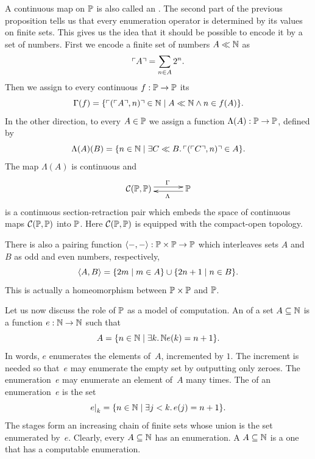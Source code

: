 A continuous map on $\mathbb{P}$ is also called an . The second part of the previous proposition tells us that
every enumeration operator is determined by its values on finite sets.
This gives us the idea that it should be possible to encode it by a
set of numbers. First we encode a finite set of numbers $A \ll \mathbb{N}$
as
%
\begin{equation*}
  \ulcorner A \urcorner = \sum_{n \in A} 2^n.
\end{equation*}
%
Then we assign to every continuous $f : \mathbb{P} \to \mathbb{P}$ its
%
\begin{equation*}
  \Gamma(f) = \{\ulcorner (\ulcorner A \urcorner, n) \urcorner \in \mathbb{N} \mid
    A \ll \mathbb{N} \land n \in f(A)
  \}.
\end{equation*}
%
In the other direction, to every $A \in \mathbb{P}$ we assign a function
$\Lambda(A) : \mathbb{P} \to \mathbb{P}$, defined by
%
\begin{equation*}
  \Lambda(A)(B) = \{n \in \mathbb{N} \mid
    \exists C \ll B .\, \ulcorner (\ulcorner C \urcorner, n) \urcorner \in A
  \}.
\end{equation*}
%
The map $\Lambda(A)$ is continuous and
%
\begin{equation*}
  \xymatrix{
    **[l]{\mathcal{C}(\Scott, \Scott)}
    \ar@<+0.25em>[r]^{\Gamma}
    &
    {\Scott}
    \ar@<+0.25em>[l]^{\Lambda}
  }
\end{equation*}
%
is a continuous section-retraction pair which embeds the space of
continuous maps $\mathcal{C}(\mathbb{P}, \mathbb{P})$ into $\mathbb{P}$. Here
$\mathcal{C}(\mathbb{P}, \mathbb{P})$ is equipped with the compact-open
topology.

There is also a pairing function $\langle {-}, {-} \rangle : \mathbb{P} \times
\mathbb{P} \to \mathbb{P}$ which interleaves sets $A$ and $B$ as odd and even
numbers, respectively,
%
\begin{equation*}
  \langle A, B \rangle = \{2 m \mid m \in A\} \cup \{2 n + 1 \mid n \in B\}.
\end{equation*}
%
This is actually a homeomorphism between $\mathbb{P} \times \mathbb{P}$ and
$\mathbb{P}$.

Let us now discuss the role of $\mathbb{P}$ as a model of computation. An
 of a set $A \subseteq \mathbb{N}$ is a function $e : \mathbb{N}
\to \mathbb{N}$ such that
%
\begin{equation*}
  A = \{n \in \mathbb{N} \mid \exists k .\,{\mathbb{N}}{e(k) = n + 1}\}.
\end{equation*}
%
In words, $e$ enumerates the elements of~$A$, incremented by $1$. The
increment is needed so that~$e$ may enumerate the empty set by
outputting only zeroes. The enumeration~$e$ may enumerate an element
of~$A$ many times. The  of an enumeration~$e$ is
the set
%
\begin{equation*}
  e{\mid}_{k} = \{n \in \mathbb{N} \mid \exists j < k .\, e(j) = n + 1\}.
\end{equation*}
%
The stages form an increasing chain of finite sets whose union is the
set enumerated by~$e$. Clearly, every $A \subseteq \mathbb{N}$ has an
enumeration. A  $A
\subseteq \mathbb{N}$ is a one that has a computable enumeration.


